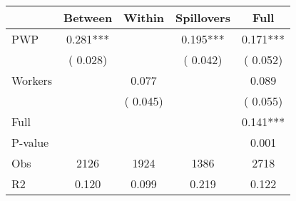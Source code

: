 
\begin{tabular}{l*{4}{c}}\hline&\multicolumn{1}{c}{Between}&\multicolumn{1}{c}{Within}&\multicolumn{1}{c}{Spillovers}&\multicolumn{1}{c}{Full}\\ \hline
 PWP           &              0.281***      &                                               &        0.195*** &         0.171***                            \\ 
                               &        (       0.028)           &                                       &       (       0.042)     &      (       0.052)                                           \\ 
 Workers       &                                               &        0.077    &                                &             0.089                            \\ 
                               &                                               & (       0.045)                  &                                        &      (       0.055)                                           \\ 
\hline                                                                                                                                                                                                                                            
 Full                  &                                               &                                               &                                        &             0.141***                                     \\ 
 P-value               &                                               &                                               &                                        &             0.001                                           \\ 
 Obs                   &               2126               &       1924                       &       1386                &              2718                                               \\ 
 R2                    &                      0.120              &              0.099                      &              0.219               &                     0.122                                              \\ 
\hline \end{tabular}                                                                                                                                                                                                              